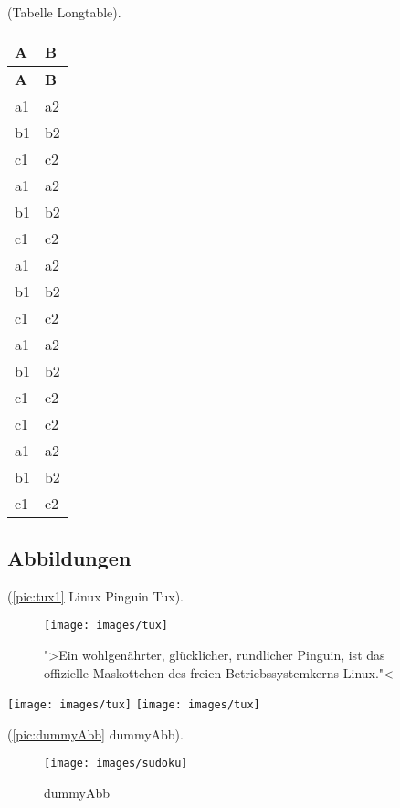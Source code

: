 (Tabelle Longtable).
\begin{longtable}{ll}%
	\toprule
	\textbf{A} & \textbf{B} \\
	\midrule
	\endfirsthead
	\toprule
	\textbf{A} & \textbf{B} \\
	\midrule
	\endhead
	a1 & a2 \\
	b1 & b2 \\
	c1 & c2 \\
	a1 & a2 \\
	b1 & b2 \\
	c1 & c2 \\
	a1 & a2 \\
	b1 & b2 \\
	c1 & c2 \\
	a1 & a2 \\
	b1 & b2 \\
	c1 & c2 \\
	c1 & c2 \\
	a1 & a2 \\
	b1 & b2 \\
	c1 & c2 \\
	\bottomrule
\end{longtable}

\newpage

\subsection{Abbildungen}\label{sec:abbildungen}

(\autoref{pic:tux1} Linux Pinguin Tux).
\begin{figure}[!hb] %
	\centering
  \texttt{[image: images/tux]}
	\caption[Tux]{">Ein wohlgenährter, glücklicher, rundlicher Pinguin, ist das
									offizielle Maskottchen des freien Betriebssystemkerns Linux."<
	}%
	\label{pic:tux1}%
\end{figure}

\texttt{[image: images/tux]}
\texttt{[image: images/tux]}

(\autoref{pic:dummyAbb} dummyAbb).    %
\begin{figure}[!hb]%
	\centering
  \texttt{[image: images/sudoku]}
	\caption{dummyAbb}%
	\label{pic:dummyAbb}%
\end{figure}

